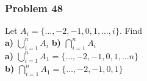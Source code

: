 \documentclass[paper=a4, fontsize=11pt]{scrartcl} %
\begin{document}
\subsubsection*{Problem 48}
Let $A_i = \{\dots,-2,-1,0,1,\ldots,i\}$. Find\\
\textbf{a)} $\displaystyle \bigcup_{i=1}^{n}A_i$ 
\textbf{b)} $\displaystyle \bigcap_{i=1}^{n}A_i$\\

\textbf{a)} $\displaystyle \bigcup_{i=1}^{n}A_1 = \{\ldots,-2,-1,0,1,\ldots n\}$\\
\textbf{b)} $\displaystyle \bigcap_{i=1}^{n}A_1 = \{\ldots,-2,-1,0,1\}$\\ 
\end{document}
